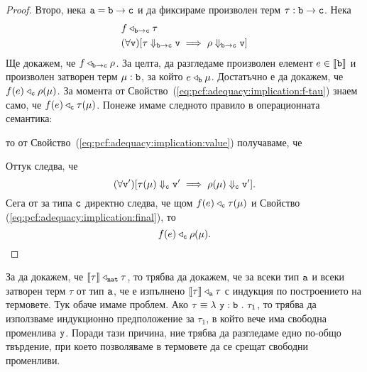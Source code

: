 \begin{proof}
  Второ, нека $\vv{a} = \arr{b}{c}$ и да фиксираме произволен терм $\tau : \arr{b}{c}$.
  Нека
  \begin{align}
    & f \triangleleft_{\arr{b}{c}} \tau \label{eq:pcf:adequacy:implication:f-tau}\\
    & (\forall \vv{v})[\tau \Downarrow_{\arr{b}{c}} \vv{v} \implies \rho \Downarrow_{\arr{b}{c}} \vv{v}] \label{eq:pcf:adequacy:implication:value}
  \end{align}
  Ще докажем, че $f \triangleleft_{\arr{b}{c}} \rho$.
  За целта, да разгледаме произволен елемент $e \in \val{\vv{b}}$ и произволен затворен терм $\mu : \vv{b}$, за който $e \triangleleft_{\vv{b}} \mu$.
  Достатъчно е да докажем, че $f(e) \triangleleft_{\vv{c}} \rho(\mu)$.
  За момента от Свойство~(\ref{eq:pcf:adequacy:implication:f-tau}) знаем само, че $f(e) \triangleleft_{\vv{c}} \tau(\mu)$.
  Понеже имаме следното правило в операционната семантика:
  \begin{prooftree}
  \end{prooftree}
  то от Свойство~(\ref{eq:pcf:adequacy:implication:value}) получаваме, че
  \begin{prooftree}
  \end{prooftree}
  Оттук следва, че
  \begin{equation}
    \label{eq:pcf:adequacy:implication:final}
    (\forall \vv{v}')[\tau(\mu) \Downarrow_{\vv{c}} \vv{v}' \implies \rho(\mu) \Downarrow_{\vv{c}} \vv{v}'].
  \end{equation}
  Сега от \IndHyp за типа $\vv{c}$ директно следва, че щом $f(e) \triangleleft_{\vv{c}}\tau(\mu)$ и Свойство (\ref{eq:pcf:adequacy:implication:final}), то \[f(e) \triangleleft_{\vv{c}} \rho(\mu).\]
\end{proof}

За да докажем, че $\val{\tau} \triangleleft_{\vv{nat}} \tau$, то трябва да докажем, че за всеки тип $\vv{a}$ и всеки затворен терм $\tau$ от тип $\vv{a}$, че е изпълнено
$\val{\tau} \triangleleft_{\vv{a}} \tau$ с индукция по построението на термовете.
Тук обаче имаме проблем. Ако $\tau \equiv \lamb{y}{b}{\tau_1}$, то трябва да използваме индукционно предположение за $\tau_1$,
в който вече има свободна променлива $\vv{y}$. Поради тази причина, ние трябва да разгледаме едно по-общо твърдение, при което позволяваме в термовете да се срещат свободни променливи.

